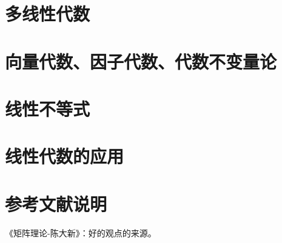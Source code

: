 \documentclass[UTF8]{../../09-Mathematics}
\begin{document}
\chapter{多线性代数}

\chapter{向量代数、因子代数、代数不变量论}


\chapter{线性不等式}

\chapter{线性代数的应用}




\chapter{参考文献说明}
《矩阵理论-陈大新》：好的观点的来源。


\end{document}
